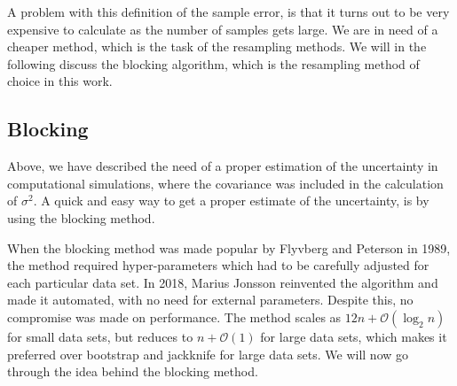 A problem with this definition of the sample error, is that it turns out to be very expensive to calculate as the number of samples gets large. We are in need of a cheaper method, which is the task of the resampling methods. We will in the following discuss the blocking algorithm, which is the resampling method of choice in this work. 

\subsection{Blocking}\label{sec:resampling}
Above, we have described the need of a proper estimation of the uncertainty in computational simulations, where the covariance was included in
the calculation of $\sigma^2$. A quick and easy way to get a proper estimate of the uncertainty, is by using the blocking method.

When the blocking method was made popular by Flyvberg and Peterson in 1989, the method required hyper-parameters which had to be carefully adjusted for each particular data set. \cite{flyvbjerg_error_1989} In 2018, Marius Jonsson reinvented the algorithm and made it automated, with no need for external parameters. Despite this, no compromise was made on performance. The method scales as $12n+\mathcal{O}(\log_2n)$ for small data sets, but reduces to $n+\mathcal{O}(1)$ for large data sets, which makes it preferred over bootstrap and jackknife for large data sets. \cite{jonsson_standard_2018} We will now go through the idea behind the blocking method.

